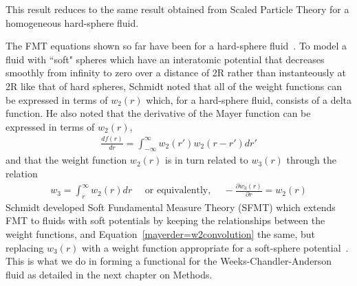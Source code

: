 \documentclass[double,12pt]{beavtex}
\begin{document}
This result reduces to the same result obtained from Scaled Particle Theory 
for a homogeneous hard-sphere fluid.

The FMT equations shown so far have been for a hard-sphere fluid~\cite{Hansen}.
To model a fluid with ``soft" spheres which have an interatomic potential 
that decreases smoothly from infinity to zero over a distance of 2R rather than instanteously 
at 2R like that of hard spheres, Schmidt noted that 
all of the weight functions can be expressed in terms of 
$w_{2}(r)$ which, for a hard-sphere fluid, consists of a delta function.
He also noted that the derivative of the Mayer function 
can be expressed in terms of $w_{2}(r)$, 
\begin{align}\label{mayerder=w2convolution}
     \frac{df(r)}{dr} = \int_{-\infty}^\infty{w_2(r')w_2(r-r')dr'}
\end{align} 
and that the weight function $w_{2}(r)$ is in turn related to $w_{3}(r)$ through 
the relation
\begin{align}\label{w2_w3_relation}
    w_{3}=\int_{r}^{\infty}{w_{2}(r)dr}\mbox{~~~~or equivalently,~~~~}-\frac{\partial{w_3(r)}}{\partial{r}}=w_2(r)
\end{align}
Schmidt developed Soft Fundamental Measure Theory (SFMT) which extends FMT to fluids 
with soft potentials by keeping the relationships between the weight 
functions, and Equation~\ref{mayerder=w2convolution} 
the same, but replacing $w_{3}(r)$ with a weight function appropriate 
for a soft-sphere potential~\cite{schmidt1999density, schmidt2000fluid}. 
This is what we do in forming a functional for the Weeks-Chandler-Anderson 
fluid as detailed in the next chapter on Methods.
\end{document}
